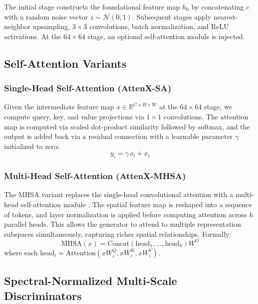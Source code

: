 \documentclass[conference]{IEEEtran}
\begin{document}
The initial stage constructs the foundational feature map $h_0$ by concatenating $c$ with a random noise vector $z \sim \mathcal{N}(0, 1)$. Subsequent stages apply nearest-neighbor upsampling, $3 \times 3$ convolutions, batch normalization, and ReLU activations. At the $64 \times 64$ stage, an optional self-attention module is injected.

\subsection{Self-Attention Variants}

\subsubsection{Single-Head Self-Attention (AttenX-SA)}
Given the intermediate feature map $x \in \mathbb{R}^{C \times H \times W}$ at the $64 \times 64$ stage, we compute query, key, and value projections via $1 \times 1$ convolutions. The attention map is computed via scaled dot-product similarity followed by softmax, and the output is added back via a residual connection with a learnable parameter $\gamma$ initialized to zero:
\begin{equation}
    y_i = \gamma \, o_i + x_i
\end{equation}

\subsubsection{Multi-Head Self-Attention (AttenX-MHSA)}
The MHSA variant replaces the single-head convolutional attention with a multi-head self-attention module \cite{vaswani2017attention}. The spatial feature map is reshaped into a sequence of tokens, and layer normalization is applied before computing attention across $h$ parallel heads. This allows the generator to attend to multiple representation subspaces simultaneously, capturing richer spatial relationships. Formally:
\begin{equation}
    \text{MHSA}(x) = \text{Concat}(\text{head}_1, \dots, \text{head}_h) W^O
\end{equation}
where each $\text{head}_i = \text{Attention}(x W_i^Q, x W_i^K, x W_i^V)$.

\subsection{Spectral-Normalized Multi-Scale Discriminators}
\end{document}
